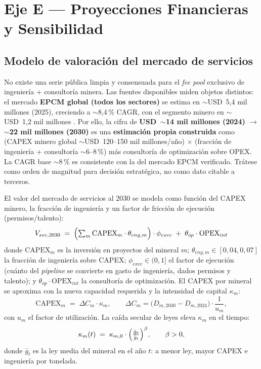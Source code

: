 \documentclass[11pt,letterpaper]{report}
\begin{document}
\chapter{Eje E --- Proyecciones Financieras y Sensibilidad}
\label{cap:financiero}

\section{Modelo de valoración del mercado de servicios}
\label{sec:caveat}
\begin{cajanota}
No existe una serie pública limpia y consensuada para el \emph{fee pool} exclusivo de ingeniería + consultoría minera. Las fuentes
disponibles miden objetos distintos: el mercado \textbf{EPCM global (todos los sectores)} se estima en $\sim$USD~5{,}4 mil millones
(2025), creciendo a $\sim$8{,}4\,\% CAGR, con el segmento minero en $\sim$USD~1{,}2 mil millones \citep{epcm_market}. Por ello, la
cifra de \textbf{USD~$\sim$14 mil millones (2024) $\rightarrow$ $\sim$22 mil millones (2030)} es una \textbf{estimación propia
construida} como (CAPEX minero global $\sim$USD~120--150 mil millones/año) $\times$ (fracción de ingeniería + consultoría
$\sim$6--8\,\%) más consultoría de optimización sobre OPEX. La CAGR base $\sim$8\,\% es consistente con la del mercado EPCM
verificado. Trátese como orden de magnitud para decisión estratégica, no como dato citable a terceros.
\end{cajanota}

El valor del mercado de servicios al 2030 se modela como función del CAPEX minero, la fracción de ingeniería y un factor de
fricción de ejecución (permisos/talento):
\begin{equation}
V_{svc,2030} \;=\; \Bigl(\textstyle\sum_{m} \mathrm{CAPEX}_{m}\cdot \theta_{eng,m}\Bigr)\cdot \phi_{exec}
              \;+\; \theta_{op}\cdot \mathrm{OPEX}_{int}
\label{eq:vsvc}
\end{equation}
donde $\mathrm{CAPEX}_m$ es la inversión en proyectos del mineral $m$; $\theta_{eng,m}\in[0{,}04,0{,}07]$ la fracción de
ingeniería sobre CAPEX; $\phi_{exec}\in(0,1]$ el factor de ejecución (cuánto del \emph{pipeline} se convierte en gasto de
ingeniería, dados permisos y talento); y $\theta_{op}\cdot\mathrm{OPEX}_{int}$ la consultoría de optimización. El CAPEX por mineral
se aproxima con la nueva capacidad requerida y la intensidad de capital $\kappa_m$:
\begin{equation}
\mathrm{CAPEX}_{m} \;=\; \Delta C_{m}\cdot \kappa_{m},
\qquad \Delta C_{m} = \bigl(D_{m,2030}-D_{m,2024}\bigr)\cdot \frac{1}{u_m},
\label{eq:capexm}
\end{equation}
con $u_m$ el factor de utilización. La caída secular de leyes eleva $\kappa_m$ en el tiempo:
\begin{equation}
\kappa_{m}(t) \;=\; \kappa_{m,0}\cdot\Bigl(\tfrac{\bar g_0}{\bar g_t}\Bigr)^{\beta}, \qquad \beta>0,
\label{eq:kappa}
\end{equation}
donde $\bar g_t$ es la ley media del mineral en el año $t$: a menor ley, mayor CAPEX e ingeniería por tonelada.
\end{document}
